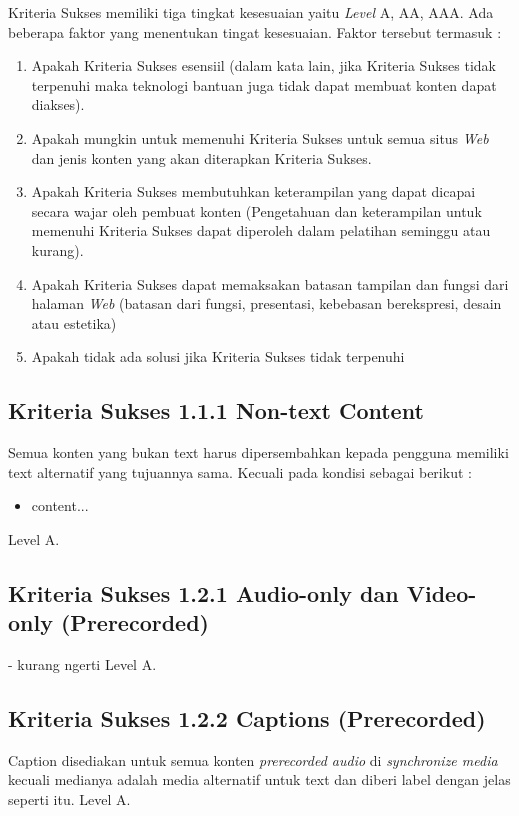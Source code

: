 Kriteria Sukses memiliki tiga tingkat kesesuaian yaitu \textit{Level} A, AA, AAA. Ada beberapa faktor yang menentukan tingat kesesuaian. Faktor tersebut termasuk :
\begin{enumerate}
	\item Apakah Kriteria Sukses esensiil (dalam kata lain, jika Kriteria Sukses tidak terpenuhi maka teknologi bantuan juga tidak dapat membuat konten dapat diakses).
	\item Apakah mungkin untuk memenuhi Kriteria Sukses untuk semua situs \textit{Web} dan jenis konten yang akan diterapkan Kriteria Sukses.
	\item Apakah Kriteria Sukses membutuhkan keterampilan yang dapat dicapai secara wajar oleh pembuat konten (Pengetahuan dan keterampilan untuk memenuhi Kriteria Sukses dapat diperoleh dalam pelatihan seminggu atau kurang).
	\item Apakah Kriteria Sukses dapat memaksakan batasan tampilan dan fungsi dari halaman \textit{Web} (batasan dari fungsi, presentasi, kebebasan berekspresi, desain atau estetika)
	\item Apakah tidak ada solusi jika Kriteria Sukses tidak terpenuhi
\end{enumerate}

\subsection{Kriteria Sukses 1.1.1 Non-text Content}
\label{sec:kriteria_1.1.1}
Semua konten yang bukan text harus dipersembahkan kepada pengguna memiliki text alternatif yang tujuannya sama. Kecuali pada kondisi sebagai berikut :
\begin{itemize}
	\item content...
\end{itemize} 
Level A.

\subsection{Kriteria Sukses 1.2.1 Audio-only dan Video-only (Prerecorded)}
\label{sec:kriteria_1.2.1}
- kurang ngerti
Level A.

\subsection{Kriteria Sukses 1.2.2 Captions (Prerecorded)}
\label{sec:kriteria_1.2.2}
Caption disediakan untuk semua konten \textit{prerecorded audio} di \textit{synchronize media} kecuali medianya adalah media alternatif untuk text dan diberi label dengan jelas seperti itu.
Level A.

